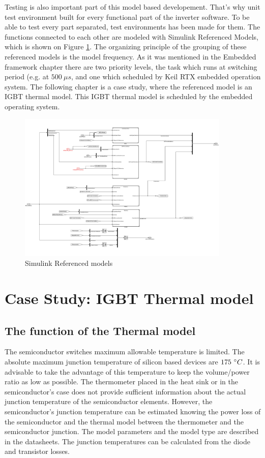Testing is also important part of this model based developement. That's why unit test environment built for every functional part of the inverter software. To be able to test every part separated, test environments has been made for them. The functions connected to each other are modeled with Simulink Referenced Models, which is shown on Figure \ref{fig:ref_model}. The organizing principle of the grouping of these referenced models is the model frequency. As it was mentioned in the Embedded framework chapter there are two priority levels, the task which runs at switching period (e.g. at $500\ \mu{}s$, and one which scheduled by Keil RTX embedded operation system. The following chapter is a case study, where the referenced model is an IGBT thermal model. This IGBT thermal model is scheduled by the embedded operating system. 

\begin{figure}[!h]
\centering
\includegraphics[width=0.9\textwidth]{figures/referenceModels.pdf}

\caption{Simulink Referenced models}
\label{fig:ref_model}
\end{figure}

\section{Case Study: IGBT Thermal model}

\subsection{The function of the Thermal model}
The semiconductor switches maximum allowable temperature is limited. The absolute maximum junction temperature of silicon based devices  are $175\ \degree{}C$. It is advisable to take the advantage of this temperature to keep the volume/power ratio as low as possible. The thermometer placed in the heat sink or in the semiconductor's case does not provide sufficient information about the actual junction temperature of the semiconductor elements. However, the semiconductor's junction temperature can be estimated knowing the power loss of the semiconductor and the thermal model between the thermometer and the semiconductor junction. The model parameters and the model type are described in the datasheets. The junction temperatures can be calculated from the diode and transistor losses.

